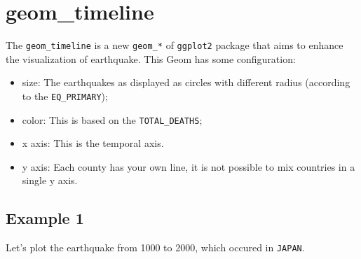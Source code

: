 \documentclass[]{book}
\providecommand{\tightlist}{%
  \setlength{\itemsep}{0pt}\setlength{\parskip}{0pt}}
\begin{document}
\chapter{geom\_timeline}\label{geom_timeline}

The \texttt{geom\_timeline} is a new \texttt{geom\_*} of
\texttt{ggplot2} package that aims to enhance the visualization of
earthquake. This Geom has some configuration:

\begin{itemize}
\tightlist
\item
  size: The earthquakes as displayed as circles with different radius
  (according to the \texttt{EQ\_PRIMARY});
\item
  color: This is based on the \texttt{TOTAL\_DEATHS};
\item
  x axis: This is the temporal axis.
\item
  y axis: Each county has your own line, it is not possible to mix
  countries in a single y axis.
\end{itemize}

\section{Example 1}\label{example_1}

Let's plot the earthquake from 1000 to 2000, which occured in
\texttt{JAPAN}.
\end{document}
